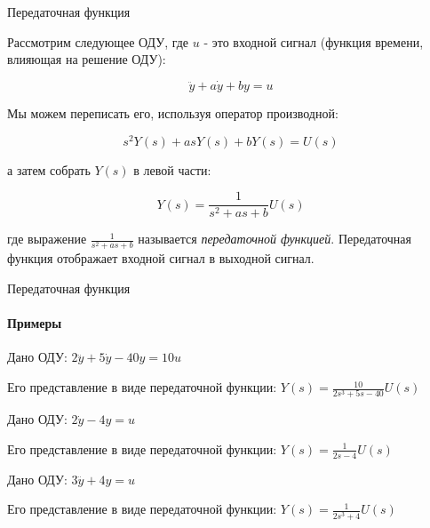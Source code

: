 \documentclass{beamer}
\begin{document}
\begin{frame}{Передаточная функция}
	\begin{flushleft}
		
		Рассмотрим следующее ОДУ, где $u$ - это входной сигнал (функция времени, влияющая на решение ОДУ):
		
		\begin{equation}
			\ddot y + a \dot y + b y = u
		\end{equation}
		
		Мы можем переписать его, используя оператор производной:
		
		\begin{equation}
			s^2 Y(s) + a s Y(s) + b Y(s) = U(s)
		\end{equation}
		
		а затем собрать $Y(s)$ в левой части:
		
		\begin{equation}
			Y(s) = \frac{1}{s^2 + a s + b} U(s)
		\end{equation}
		
		где выражение $\frac{1}{s^2 + a s + b}$ называется \emph{передаточной функцией}. Передаточная функция отображает входной сигнал в выходной сигнал.
		
	\end{flushleft}
\end{frame}



\begin{frame}{Передаточная функция}
	\framesubtitle{Примеры}
	\begin{flushleft}
		
		\begin{example}
			Дано ОДУ: $2 \dddot y + 5\dot y - 40 y = 10 u$
			
			Его представление в виде передаточной функции: 
			$Y(s)  = \frac{10}{2 s^3 + 5 s - 40} U(s)$
		\end{example}
		
		
		\begin{example}
			Дано ОДУ: $2 \dot y - 4 y = u$
			
			Его представление в виде передаточной функции:  $Y(s) = \frac{1}{2 s - 4} U(s)$
		\end{example}
		
		
		\begin{example}
			Дано ОДУ: $3 \dddot y + 4y = u$
			
			Его представление в виде передаточной функции: $Y(s) = \frac{1}{2 s^3 + 4} U(s)$
		\end{example}
		
	\end{flushleft}
\end{frame}
\end{document}
